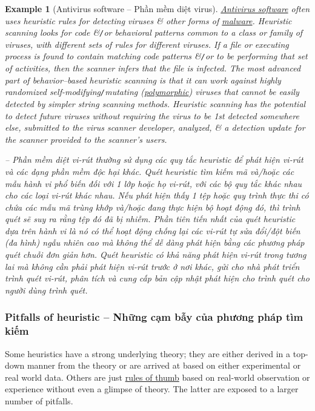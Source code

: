 \documentclass{article}
\newtheorem{example}{Example}
\begin{document}
\begin{example}[Antivirus software -- Phần mềm diệt virus]
	\href{https://en.wikipedia.org/wiki/Antivirus_software}{Antivirus software} often uses heuristic rules for detecting viruses \& other forms of \href{https://en.wikipedia.org/wiki/Malware}{malware}. Heuristic scanning looks for code \&{\tt/}or behavioral patterns common to a class or family of viruses, with different sets of rules for different viruses. If a file or executing process is found to contain matching code patterns \&{\tt/}or to be performing that set of activities, then the scanner infers that the file is infected. The most advanced part of behavior--based heuristic scanning is that it can work against highly randomized self-modifying{\tt/}mutating (\href{https://en.wikipedia.org/wiki/Polymorphic_code}{polymorphic}) viruses that cannot be easily detected by simpler string scanning methods. Heuristic scanning has the potential to detect future viruses without requiring the virus to be 1st detected somewhere else, submitted to the virus scanner developer, analyzed, \& a detection update for the scanner provided to the scanner's users.
	
	-- Phần mềm diệt vi-rút thường sử dụng các quy tắc heuristic để phát hiện vi-rút và các dạng phần mềm độc hại khác. Quét heuristic tìm kiếm mã và/hoặc các mẫu hành vi phổ biến đối với 1 lớp hoặc họ vi-rút, với các bộ quy tắc khác nhau cho các loại vi-rút khác nhau. Nếu phát hiện thấy 1 tệp hoặc quy trình thực thi có chứa các mẫu mã trùng khớp và/hoặc đang thực hiện bộ hoạt động đó, thì trình quét sẽ suy ra rằng tệp đó đã bị nhiễm. Phần tiên tiến nhất của quét heuristic dựa trên hành vi là nó có thể hoạt động chống lại các vi-rút tự sửa đổi/đột biến (đa hình) ngẫu nhiên cao mà không thể dễ dàng phát hiện bằng các phương pháp quét chuỗi đơn giản hơn. Quét heuristic có khả năng phát hiện vi-rút trong tương lai mà không cần phải phát hiện vi-rút trước ở nơi khác, gửi cho nhà phát triển trình quét vi-rút, phân tích và cung cấp bản cập nhật phát hiện cho trình quét cho người dùng trình quét.
\end{example}


\subsubsection{Pitfalls of heuristic -- Những cạm bẫy của phương pháp tìm kiếm}
Some heuristics have a strong underlying theory; they are either derived in a top-down manner from the theory or are arrived at based on either experimental or real world data. Others are just \href{https://en.wikipedia.org/wiki/Rule_of_thumb}{rules of thumb} based on real-world observation or experience without even a glimpse of theory. The latter are exposed to a larger number of pitfalls.
\end{document}
